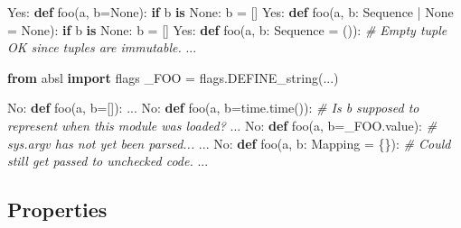 \documentclass[
]{article}
\newenvironment{Shaded}{}{}
\newcommand{\CommentTok}[1]{\textcolor[rgb]{0.38,0.63,0.69}{\textit{#1}}}
\newcommand{\ControlFlowTok}[1]{\textcolor[rgb]{0.00,0.44,0.13}{\textbf{#1}}}
\newcommand{\ImportTok}[1]{\textcolor[rgb]{0.00,0.50,0.00}{\textbf{#1}}}
\newcommand{\KeywordTok}[1]{\textcolor[rgb]{0.00,0.44,0.13}{\textbf{#1}}}
\newcommand{\NormalTok}[1]{#1}
\newcommand{\OperatorTok}[1]{\textcolor[rgb]{0.40,0.40,0.40}{#1}}
\newcommand{\VariableTok}[1]{\textcolor[rgb]{0.10,0.09,0.49}{#1}}
\begin{document}
\begin{samepage}
\begin{Shaded}
\begin{Highlighting}[]
\NormalTok{Yes: }\KeywordTok{def}\NormalTok{ foo(a, b}\OperatorTok{=}\VariableTok{None}\NormalTok{):}
         \ControlFlowTok{if}\NormalTok{ b }\KeywordTok{is} \VariableTok{None}\NormalTok{:}
\NormalTok{             b }\OperatorTok{=}\NormalTok{ []}
\NormalTok{Yes: }\KeywordTok{def}\NormalTok{ foo(a, b: Sequence }\OperatorTok{|} \VariableTok{None} \OperatorTok{=} \VariableTok{None}\NormalTok{):}
         \ControlFlowTok{if}\NormalTok{ b }\KeywordTok{is} \VariableTok{None}\NormalTok{:}
\NormalTok{             b }\OperatorTok{=}\NormalTok{ []}
\NormalTok{Yes: }\KeywordTok{def}\NormalTok{ foo(a, b: Sequence }\OperatorTok{=}\NormalTok{ ()):  }\CommentTok{\# Empty tuple OK since tuples are immutable.}
\NormalTok{         ...}
\end{Highlighting}
\end{Shaded}
\end{samepage}

\begin{samepage}
\begin{Shaded}
\begin{Highlighting}[]
\ImportTok{from}\NormalTok{ absl }\ImportTok{import}\NormalTok{ flags}
\NormalTok{\_FOO }\OperatorTok{=}\NormalTok{ flags.DEFINE\_string(...)}

\NormalTok{No:  }\KeywordTok{def}\NormalTok{ foo(a, b}\OperatorTok{=}\NormalTok{[]):}
\NormalTok{         ...}
\NormalTok{No:  }\KeywordTok{def}\NormalTok{ foo(a, b}\OperatorTok{=}\NormalTok{time.time()):  }\CommentTok{\# Is \textasciigrave{}b\textasciigrave{} supposed to represent when this module was loaded?}
\NormalTok{         ...}
\NormalTok{No:  }\KeywordTok{def}\NormalTok{ foo(a, b}\OperatorTok{=}\NormalTok{\_FOO.value):  }\CommentTok{\# sys.argv has not yet been parsed...}
\NormalTok{         ...}
\NormalTok{No:  }\KeywordTok{def}\NormalTok{ foo(a, b: Mapping }\OperatorTok{=}\NormalTok{ \{\}):  }\CommentTok{\# Could still get passed to unchecked code.}
\NormalTok{         ...}
\end{Highlighting}
\end{Shaded}
\end{samepage}

\subsection{Properties}
\end{document}
